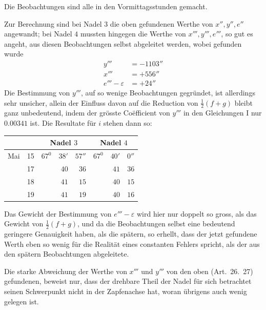 Die Beobachtungen sind alle in den Vormittagsstunden gemacht.

Zur Berechnung sind bei Nadel $3$ die oben gefundenen Werthe von $x'',y'',e''$ angewandt; bei Nadel $4$ mussten hingegen die Werthe von $x''',y''',e'''$, so gut es angeht, aus diesen Beobachtungen selbst abgeleitet werden, wobei gefunden wurde
\[
\begin{aligned}
y'''&=-1103''\\
x'''&=+556''\\
e'''-\varepsilon&=+24''
\end{aligned}
\]
Die Bestimmung von $y'''$, auf so wenige Beobachtungen gegründet, ist allerdings sehr unsicher, allein der Einfluss davon auf die Reduction von $\tfrac12(f+g)$ bleibt ganz unbedeutend, indem der grösste Coëfficient von $y'''$ in den Gleichungen I nur $0.00341$ ist. Die Resultate für $i$ stehen dann so:
\begin{center}
\begin{tabular}{rr||rrr||rrr}
\multicolumn{2}{c||}{}&\multicolumn{3}{c||}{Nadel $3$}&\multicolumn{3}{c}{Nadel $4$}\\\hline
Mai&15&$67^0$&$38'$&$57''$&$67^0$&$40'$&$0''$\\
&17&&$40$&$36$&&$41$&$36$\\
&18&&$41$&$15$&&$40$&$15$\\
&19&&$41$&$19$&&$40$&$16$
\end{tabular}
\end{center}
Das Gewicht der Bestimmung von $e'''-\varepsilon$ wird hier nur doppelt so gross, als das Gewicht von $\tfrac12(f+g)$, und da die Beobachtungen selbst eine bedeutend geringere Genauigkeit haben, als die spätern, so erhellt, dass der jetzt gefundene Werth eben so wenig für die Realität eines constanten Fehlers spricht, als der aus den spätern Beobachtungen abgeleitete.

Die starke Abweichung der Werthe von $x'''$ und $y'''$ von den oben (Art.\ 26.\ 27) gefundenen, beweist nur, dass der drehbare Theil der Nadel für sich betrachtet seinen Schwerpunkt nicht in der Zapfenachse hat, woran übrigens auch wenig gelegen ist.

